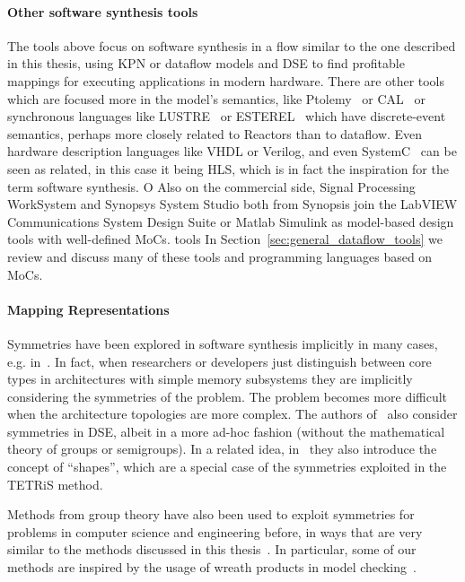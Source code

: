 \paragraph{Other software synthesis tools}
The tools above focus on software synthesis in a flow similar to the one described in this thesis, using \ac{KPN} or dataflow models and \ac{DSE} to find profitable mappings for executing applications in modern hardware.
There are other tools which are focused more in the model's semantics, like Ptolemy~\cite{Ptolemaeus:14:SystemDesign} or CAL~\cite{eker2003cal} or synchronous languages like LUSTRE~\cite{pilaud1987lustre} or ESTEREL~\cite{boussinot1991esterel} which have discrete-event semantics, perhaps more closely related to Reactors than to dataflow.
Even hardware description languages like VHDL or Verilog, and even SystemC~\cite{semantics_systemc} can be seen as related, in this case it being \ac{HLS}, which is in fact the inspiration for the term software synthesis.
O
Also on the commercial side, Signal Processing WorkSystem and Synopsys System Studio both from Synopsis join the LabVIEW Communications System Design Suite or Matlab Simulink as model-based design tools with well-defined \acp{MoC}.
tools 
In Section~\ref{sec:general_dataflow_tools} we review and discuss many of these tools and programming languages based on \acp{MoC}.



\paragraph{Mapping Representations}
Symmetries have been explored in software synthesis implicitly in many cases, e.g. in~\cite{singh2010communication,thompson2013exploiting}. 
In fact, when researchers or developers just distinguish between core types in architectures with simple memory subsystems they are implicitly considering the symmetries of the problem.
The problem becomes more difficult when the architecture topologies are more complex.
The authors of~\cite{schwarzer2017symmetry} also consider symmetries in \ac{DSE}, albeit in a more ad-hoc fashion (without the mathematical theory of groups or semigroups).
In a related idea, in~\cite{shapes} they also introduce the concept of ``shapes'', which are a special case of the symmetries exploited in the \ac{TETRiS} method.

Methods from group theory have also been used to exploit symmetries for problems in computer science and engineering before, in ways that are very similar to the methods discussed in this thesis~\cite{crawford1996symmetry,clarke1998symmetry}.
In particular, some of our methods are inspired by the usage of wreath products in model checking~\cite{donaldson2009constructive}.

